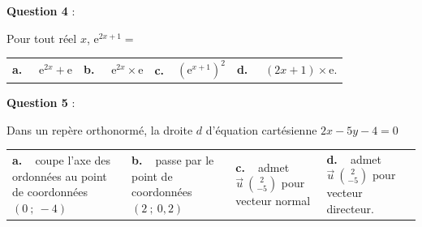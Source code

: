 \documentclass[10pt]{article}
\providecommand{\vv}[1]{\overrightarrow{#1}}
\providecommand{\e}{{\mathrm{e}}}
\providecommand{\vv}[1]{{\overrightarrow{#1}}}
\begin{document}
\medskip
\textbf{Question 4} :
\medskip 

Pour tout réel $x$, $\e^{2x+1}=$

\begin{center}
\begin{tabularx}{\linewidth}{*{4}{X}}
\textbf{a.~~} $\e^{2x} + \e $ &\textbf{b.~~} $\e^{2x} \times \e $&\textbf{c.~~}$(\e^{x+1})^2 $& \textbf{d.~~} $(2x+1)\times \e $.
\end{tabularx}
\end{center}

\medskip
\textbf{Question 5} :
\medskip 

Dans un repère orthonormé, la droite $d$ d'équation cartésienne $2x-5y-4=0$

\begin{center}
\begin{tabularx}{\linewidth}{*{4}{X}}
\textbf{a.~~}coupe l'axe des ordonnées au point de coordonnées $(0~;~-4)$ &\textbf{b.~~}passe par le point de coordonnées $(2~;~0,2)$&\textbf{c.~~}admet  $\vv{u}\ \binom{2}{-5}$ pour vecteur normal& \textbf{d.~~}admet $\vv{u}\ \binom{2}{-5}$   pour vecteur directeur.
\end{tabularx}
\end{center}


\vspace{1cm}
\end{document}
